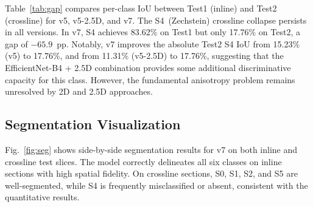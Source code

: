 \documentclass[journal]{IEEEtran}
\begin{document}
Table~\ref{tab:gap} compares per-class IoU between Test1 (inline) and Test2 (crossline) for v5, v5-2.5D, and v7. The S4~(Zechstein) crossline collapse persists in all versions. In v7, S4 achieves 83.62\% on Test1 but only 17.76\% on Test2, a gap of $-65.9$~pp. Notably, v7 improves the absolute Test2 S4 IoU from 15.23\% (v5) to 17.76\%, and from 11.31\% (v5-2.5D) to 17.76\%, suggesting that the EfficientNet-B4 + 2.5D combination provides some additional discriminative capacity for this class. However, the fundamental anisotropy problem remains unresolved by 2D and 2.5D approaches.

\begin{table}[!t]
\caption{Per-Class IoU: Test1 (Inline) vs.\ Test2 (Crossline) (\%)}
\label{tab:gap}
\centering
{}
\end{table}

\subsection{Segmentation Visualization}

Fig.~\ref{fig:seg} shows side-by-side segmentation results for v7 on both inline and crossline test slices. The model correctly delineates all six classes on inline sections with high spatial fidelity. On crossline sections, S0, S1, S2, and S5 are well-segmented, while S4 is frequently misclassified or absent, consistent with the quantitative results.
\end{document}
